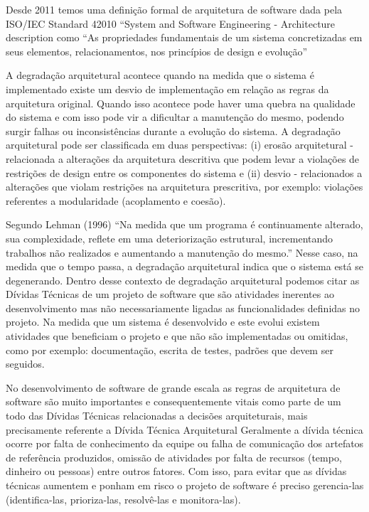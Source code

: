 \documentclass[
	12pt,				%
	openright,			%
	twoside,			%
	a4paper,			%
	english,			%
	french,				%
	spanish,			%
	brazil,				%
	]{abntex2}
\begin{document}
Desde 2011 temos uma definição formal de arquitetura de software dada
pela ISO/IEC Standard 42010 \textquotedblleft System and Software
Engineering - Architecture description\textquotedbl{} como \textquotedblleft As
propriedades fundamentais de um sistema concretizadas em seus elementos,
relacionamentos, nos princípios de design e evolução\textquotedblright {} 

A degradação arquitetural acontece quando na medida que o sistema
é implementado existe um desvio de implementação em relação as regras
da arquitetura original. Quando isso acontece pode haver uma quebra
na qualidade do sistema e com isso pode vir a dificultar a manutenção
do mesmo, podendo surgir falhas ou inconsistências durante a evolução
do sistema. A degradação arquitetural pode ser classificada em duas
perspectivas: (i) erosão arquitetural - relacionada a alterações da
arquitetura descritiva que podem levar a violações de restrições de
design entre os componentes do sistema e (ii) desvio - relacionados
a alterações que violam restrições na arquitetura prescritiva, por
exemplo: violações referentes a modularidade (acoplamento e coesão). 

Segundo Lehman (1996) \textquotedblleft Na medida que um programa
é continuamente alterado, sua complexidade, reflete em uma deteriorização
estrutural, incrementando trabalhos não realizados e aumentando a
manutenção do mesmo.\textquotedblright{} Nesse caso, na medida que
o tempo passa, a degradação arquitetural indica que o sistema está
se degenerando. Dentro desse contexto de degradação
arquitetural podemos citar as Dívidas Técnicas de um projeto de software
que são atividades inerentes ao desenvolvimento mas não necessariamente
ligadas as funcionalidades definidas no projeto. Na medida que um
sistema é desenvolvido e este evolui existem atividades que beneficiam
o projeto e que não são implementadas ou omitidas, como por exemplo:
documentação, escrita de testes, padrões que devem ser seguidos. 

No desenvolvimento de software de grande escala as regras de arquitetura
de software são muito importantes e consequentemente vitais como parte
de um todo das Dívidas Técnicas relacionadas a decisões arquiteturais,
mais precisamente referente a Dívida Técnica Arquitetural
Geralmente a dívida técnica ocorre por falta de conhecimento da equipe
ou falha de comunicação dos artefatos de referência produzidos, omissão
de atividades por falta de recursos (tempo, dinheiro ou pessoas) entre
outros fatores. Com isso, para evitar que as dívidas técnicas aumentem
e ponham em risco o projeto de software é preciso gerencia-las (identifica-las,
prioriza-las, resolvê-las e monitora-las). 
\end{document}
